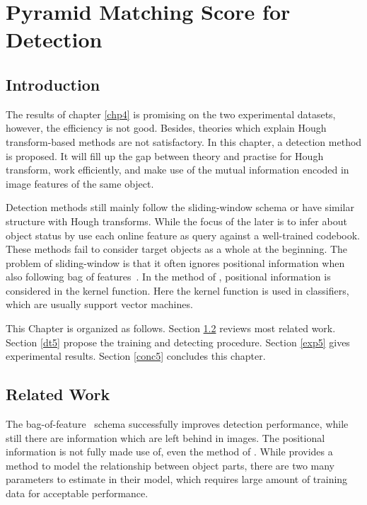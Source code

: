 \chapter{Pyramid Matching Score for Detection}
\label{chp5}

\section{Introduction}

The results of chapter \ref{chp4} is promising on the two experimental datasets, however, the efficiency is not good. Besides, theories which explain Hough transform-based methods are not satisfactory. In this chapter, a detection method is proposed. It will fill up the gap between theory and practise for Hough transform, work efficiently, and make use of the mutual information encoded in image features of the same object.

Detection methods still mainly follow the sliding-window schema or have similar structure with Hough transforms. While the focus of the later is to infer about object status by use each online feature as query against a well-trained codebook. These methods fail to consider target objects as a whole at the beginning. The problem of sliding-window is that it often ignores positional information when also following bag of features~\cite{bgf}. In the method of \cite{spmk}, positional information is considered in the kernel function. Here the kernel function\cite{kmts} is used in classifiers, which are usually support vector machines. 




This Chapter is organized as follows. Section \ref{rw5} reviews most related work. Section \ref{dt5} propose the training and detecting procedure. Section \ref{exp5} gives experimental results. Section \ref{conc5} concludes this chapter.

\section{Related Work}
\label{rw5}
The bag-of-feature~\cite{bgf} schema successfully improves detection performance, while still there are information which are left behind in images. The positional information is not fully made use of, even the method of \cite{kmts}. While \cite{uspl} provides a method to model the relationship between object parts, there are two many parameters to estimate in their model, which requires large amount of training data for acceptable performance. 

